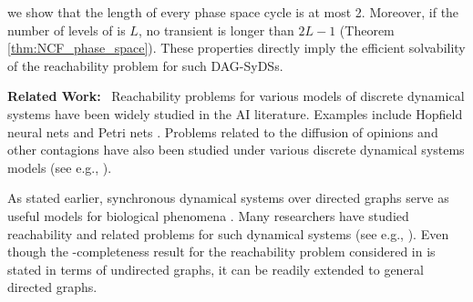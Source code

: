  we show
that the length of every phase space cycle is at most 2.
Moreover, if the number of levels of  \cals{} is $L$,
no transient is longer than $2L-1$
(Theorem \ref{thm:NCF_phase_space}).
These properties
directly imply the efficient solvability of the reachability
problem for such DAG-SyDSs.
\fi

\smallskip

\noindent
\textbf{Related Work:}~ Reachability problems for various
models of discrete dynamical systems have been widely studied
in the AI literature.
Examples include 
Hopfield neural nets \cite{FO-1989,Orponen-1993,Orponen-1994}
and Petri nets \cite{Esparza-etal-1994}.
Problems related to the diffusion of opinions and other contagions have
also been studied under various discrete dynamical systems
models (see e.g., 
\cite{Auletta-etal-2018,Botan-etal-2019,Chistikov-etal-2020,BE-2017}).

As stated earlier, synchronous dynamical systems over 
directed graphs serve as useful models for biological
phenomena \cite{Kauffman-etal-2003}.
Many researchers have studied reachability and related 
problems for such dynamical systems (see e.g., 
\cite{OU-2020,OU-2017}). 
Even though the \cpsp-completeness result for the reachability problem 
considered in \cite{Rosenkrantz-etal-2018} is stated in terms of undirected
graphs, it can be readily extended to general directed graphs.

